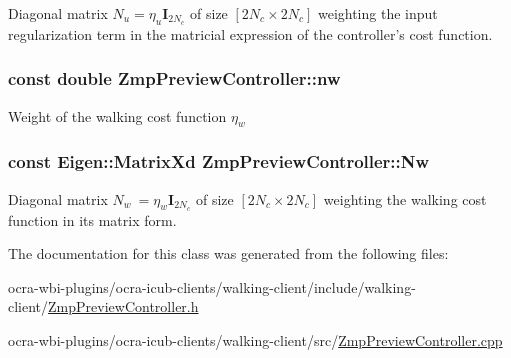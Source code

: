 \-Diagonal matrix $N_u = \eta_u\mathbf{I}_{2N_c}$ of size $[2N_c \times 2N_c]$ weighting the input regularization term in the matricial expression of the controller's cost function. \hypertarget{classZmpPreviewController_a783427b817d77469e1f80426bede5310}{
\subsubsection[{nw}]{\setlength{\rightskip}{0pt plus 5cm}const double {\bf \-Zmp\-Preview\-Controller\-::nw}}}\label{classZmpPreviewController_a783427b817d77469e1f80426bede5310}
\-Weight of the walking cost function $ \eta_w $ \hypertarget{classZmpPreviewController_a5e85354a1a7c3f2a8e265dbe7367051c}{
\subsubsection[{\-Nw}]{\setlength{\rightskip}{0pt plus 5cm}const \-Eigen\-::\-Matrix\-Xd {\bf \-Zmp\-Preview\-Controller\-::\-Nw}}}\label{classZmpPreviewController_a5e85354a1a7c3f2a8e265dbe7367051c}
\-Diagonal matrix $N_w\ = \eta_w\mathbf{I}_{2N_c}$ of size $[2N_c \times 2N_c]$ weighting the walking cost function in its matrix form. 

\-The documentation for this class was generated from the following files\-:\begin{DoxyCompactItemize}
\item 
ocra-\/wbi-\/plugins/ocra-\/icub-\/clients/walking-\/client/include/walking-\/client/\hyperlink{ZmpPreviewController_8h}{\-Zmp\-Preview\-Controller.\-h}\item 
ocra-\/wbi-\/plugins/ocra-\/icub-\/clients/walking-\/client/src/\hyperlink{ZmpPreviewController_8cpp}{\-Zmp\-Preview\-Controller.\-cpp}\end{DoxyCompactItemize}
